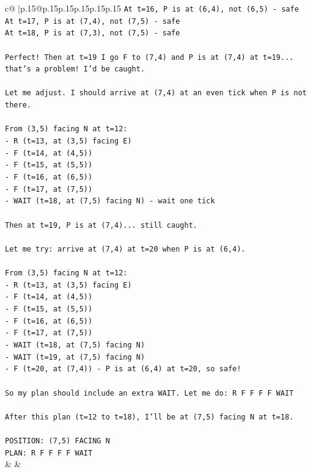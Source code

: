 \documentclass{article}
\begin{document}
{\begin{supertabular}{c@{$\;$}|p{.15\linewidth}@{}p{.15\linewidth}p{.15\linewidth}p{.15\linewidth}p{.15\linewidth}p{.15\linewidth}}
{{{\texttt{At t=16, P is at (6,4), not (6,5) {-} safe} \\
\texttt{At t=17, P is at (7,4), not (7,5) {-} safe} \\
\texttt{At t=18, P is at (7,3), not (7,5) {-} safe} \\
\\ 
\texttt{Perfect! Then at t=19 I go F to (7,4) and P is at (7,4) at t=19... that's a problem! I'd be caught.} \\
\\ 
\texttt{Let me adjust. I should arrive at (7,4) at an even tick when P is not there.} \\
\\ 
\texttt{From (3,5) facing N at t=12:} \\
\texttt{{-} R (t=13, at (3,5) facing E)} \\
\texttt{{-} F (t=14, at (4,5))} \\
\texttt{{-} F (t=15, at (5,5))} \\
\texttt{{-} F (t=16, at (6,5))} \\
\texttt{{-} F (t=17, at (7,5))} \\
\texttt{{-} WAIT (t=18, at (7,5) facing N) {-} wait one tick} \\
\\ 
\texttt{Then at t=19, P is at (7,4)... still caught.} \\
\\ 
\texttt{Let me try: arrive at (7,4) at t=20 when P is at (6,4).} \\
\\ 
\texttt{From (3,5) facing N at t=12:} \\
\texttt{{-} R (t=13, at (3,5) facing E)} \\
\texttt{{-} F (t=14, at (4,5))} \\
\texttt{{-} F (t=15, at (5,5))} \\
\texttt{{-} F (t=16, at (6,5))} \\
\texttt{{-} F (t=17, at (7,5))} \\
\texttt{{-} WAIT (t=18, at (7,5) facing N)} \\
\texttt{{-} WAIT (t=19, at (7,5) facing N)} \\
\texttt{{-} F (t=20, at (7,4)) {-} P is at (6,4) at t=20, so safe!} \\
\\ 
\texttt{So my plan should include an extra WAIT. Let me do: R F F F F WAIT} \\
\\ 
\texttt{After this plan (t=12 to t=18), I'll be at (7,5) facing N at t=18.} \\
\\ 
\texttt{POSITION: (7,5) FACING N} \\
\texttt{PLAN: R F F F F WAIT} \\
            }
        }
    }
    & & \\ \\


\end{supertabular}}
\end{document}
